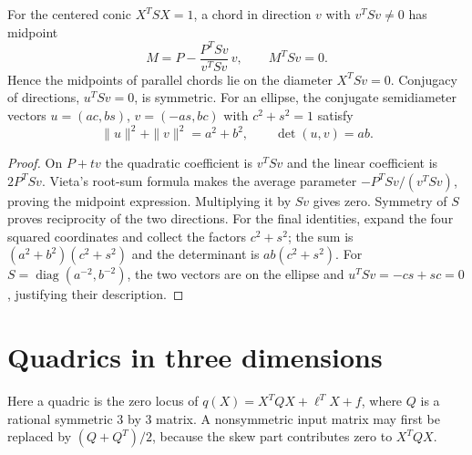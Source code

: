\begin{theorem}
\label{con:diameters}
For the centered conic $X^TSX=1$, a chord in direction $v$ with
$v^TSv\ne0$ has midpoint
\[
 M=P-\frac{P^TSv}{v^TSv}\,v,
 \qquad M^TSv=0.
\]
Hence the midpoints of parallel chords lie on the diameter $X^TSv=0$.
Conjugacy of directions, $u^TSv=0$, is symmetric. For an ellipse,
the conjugate semidiameter vectors
$u=(ac,bs)$, $v=(-as,bc)$ with $c^2+s^2=1$ satisfy
\[
 \|u\|^2+\|v\|^2=a^2+b^2,\qquad \det(u,v)=ab.
\]
\end{theorem}
\begin{proof}
On $P+tv$ the quadratic coefficient is $v^TSv$ and the linear
coefficient is $2P^TSv$. Vieta's root-sum formula makes the average
parameter $-P^TSv/(v^TSv)$, proving the midpoint expression.
Multiplying it by $Sv$ gives zero. Symmetry of $S$ proves reciprocity
of the two directions. For the final identities, expand the four
squared coordinates and collect the factors $c^2+s^2$; the sum is
$(a^2+b^2)(c^2+s^2)$ and the determinant is $ab(c^2+s^2)$.
For $S=\operatorname{diag}(a^{-2},b^{-2})$, the two vectors are on
the ellipse and $u^TSv=-cs+sc=0$, justifying their description.
\end{proof}

\section{Quadrics in three dimensions}
\label{sec:quadrics}

Here a quadric is the zero locus of $q(X)=X^TQX+\ell^TX+f$,
where $Q$ is a rational symmetric $3$ by $3$ matrix. A nonsymmetric
input matrix may first be replaced by $(Q+Q^T)/2$, because the skew
part contributes zero to $X^TQX$.

